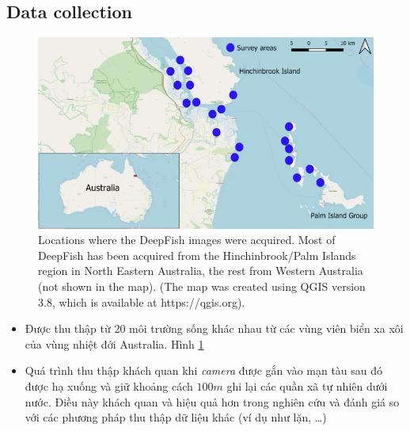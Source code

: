 \documentclass{article}
\begin{document}
        \subsection{Data collection}
        \begin{figure}[ht!]
            \centering
            \includegraphics[width = \linewidth]{fig1.jpg}
            \caption{Locations where the DeepFish images were acquired. Most of DeepFish has been acquired from the Hinchinbrook/Palm Islands region in North Eastern Australia, the rest from Western Australia (not shown in the map).
(The map was created using QGIS version 3.8, which is available at https://qgis.org).}
            \label{fig1}
        \end{figure}
        \begin{itemize}
            \item Được thu thập từ 20 môi trường sống khác nhau từ các vùng viên biển xa xôi của vùng nhiệt đới Australia. Hình \ref{fig1}
            \item Quá trình thu thập khách quan khi \textit{camera} được gắn vào mạn tàu sau đó được hạ xuống và giữ khoảng cách $100m$ ghi lại các quần xã tự nhiên dưới nước. Điều này khách quan và hiệu quả hơn trong nghiên cứu và đánh giá so với các phương pháp thu thập dữ liệu khác (ví dụ như lặn, \ldots) 
        \end{itemize}
\end{document}
